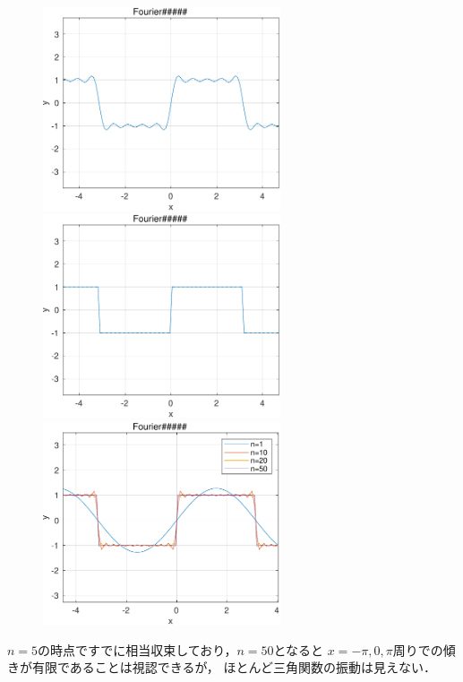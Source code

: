 \documentclass[uplatex, dvipdfmx]{jsarticle}
\begin{document}
\begin{figure}[h]\centering
    \includegraphics[width=7cm]{four1.pdf}
    \includegraphics[width=7cm]{four2.pdf}
    \includegraphics[width=7cm]{four3.pdf}
\end{figure}

$n=5$の時点ですでに相当収束しており，$n=50$となると
$x=-\pi,0,\pi$周りでの傾きが有限であることは視認できるが，
ほとんど三角関数の振動は見えない．
\end{document}
